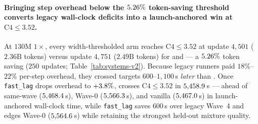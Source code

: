 \paragraph{Bringing step overhead below the $5.26\%$ token-saving threshold converts legacy wall-clock deficits into a launch-anchored win at $\text{C4}\le 3.52$.}
At $130\text{M}$ $1\times$, every width-thresholded arm reaches
$\text{C4}\le 3.52$ at update $4{,}501$ ($2.36\text{B}$ tokens) versus update
$4{,}751$ ($2.49\text{B}$ tokens) for  and  --- a
$5.26\%$ token saving ($250$ updates; Table~\ref{tab:systems-v2}).
Because legacy runners paid $18\%$--$22\%$ per-step overhead, they crossed
targets $600$--$1{,}100$\,s \emph{later} than . Once
\texttt{fast\_lag} drops overhead to $+3.8\%$,
 crosses $\text{C4}\le 3.52$ in
$5{,}458.9$\,s --- ahead of same-wave 
($5{,}468.4$\,s), Wave-0 
($5{,}566.3$\,s), and vanilla 
($5{,}467.0$\,s) in launch-anchored wall-clock time,
while \texttt{fast\_lag}  saves $600$\,s over legacy Wave~4
and edges Wave-0  ($5{,}564.6$\,s) while
retaining the strongest held-out mixture quality.

\begin{table}[t]
\centering
\caption{Launch-anchored eight-A100 wall-clock time-to-target crossings on
Paloma \texttt{c4\_en} ($130\text{M}$ $1\times$ Chinchilla, seed~0,
$2.68\text{B}$ tokens). Elapsed times include compilation, training,
evaluation, and checkpointing from job launch; step indices mark the first
logged evaluation meeting each C4 threshold.  fails to reach
$\text{C4}\le 3.46$ within the $5{,}120$-update budget (censored at
$\waveZeroMuonCfourFinalAbs{}$).}
\label{tab:systems-v2}
\footnotesize\setlength{\tabcolsep}{5.0pt}
\resizebox{\textwidth}{!}{}
\end{table}

